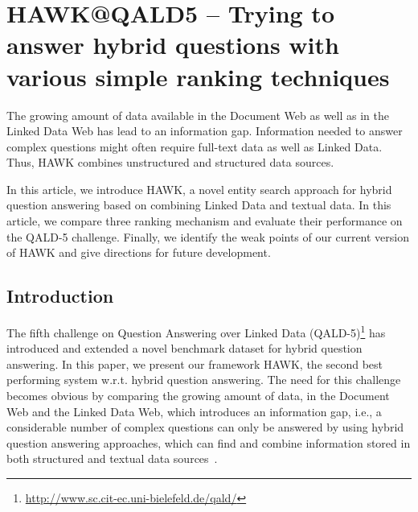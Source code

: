 

%

\chapter{HAWK@QALD5 -- Trying to answer hybrid questions with various simple ranking techniques}



The growing amount of data available in the Document Web as well as in the Linked Data Web has lead to an information gap.
Information needed to answer complex questions might often require full-text data as well as Linked Data.
Thus, HAWK combines unstructured and structured data sources.   

In this article, we introduce HAWK, a novel entity search approach for hybrid question answering based on combining Linked Data and textual data.
In this article, we compare three ranking mechanism and evaluate their performance on the QALD-5 challenge. 
Finally, we identify the weak points of our current version of HAWK and give directions for future development.


\section{Introduction}
The fifth challenge on Question Answering over Linked Data (QALD-5)\footnote{\url{http://www.sc.cit-ec.uni-bielefeld.de/qald/}} has introduced and extended a novel benchmark dataset for hybrid question answering.
In this paper, we present our framework HAWK, the second best performing system w.r.t. hybrid question answering. 
The need for this challenge becomes obvious by comparing the growing amount of data, in the Document Web and the Linked Data Web, which introduces an information gap, i.e., a considerable number of complex questions can only be answered by using hybrid question answering approaches, which can find and combine information stored in both structured and textual data sources~\cite{combiningLDandIR}.

